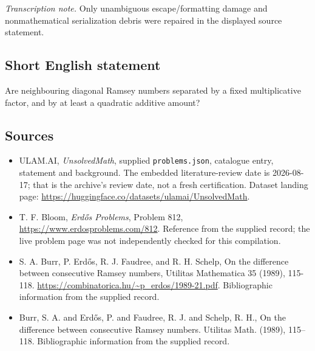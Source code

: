\documentclass[11pt,a4paper]{article}
\begin{document}
{\small\emph{Transcription note.} Only unambiguous escape/formatting damage and nonmathematical serialization debris were repaired in the displayed source statement.}

\subsection{Short English statement}

Are neighbouring diagonal Ramsey numbers separated by a fixed multiplicative factor, and by at least a quadratic additive amount?

\subsection{Sources}

{\small

\begin{itemize}

\item[\hypertarget{source:statement:1}{S1}] ULAM.AI, \emph{UnsolvedMath}, supplied \texttt{problems.json}, catalogue entry, statement and background. The embedded literature-review date is 2026-08-17; that is the archive’s review date, not a fresh certification. Dataset landing page: \url{https://huggingface.co/datasets/ulamai/UnsolvedMath}.

\item[\hypertarget{source:statement:2}{S2}] T. F. Bloom, \emph{Erdős Problems}, Problem 812, \url{https://www.erdosproblems.com/812}. Reference from the supplied record; the live problem page was not independently checked for this compilation.

\item[\hypertarget{source:statement:3}{S3}] S. A. Burr, P. Erdős, R. J. Faudree, and R. H. Schelp, On the difference between consecutive Ramsey numbers, Utilitas Mathematica 35 (1989), 115-118. \url{https://combinatorica.hu/~p_erdos/1989-21.pdf}. Bibliographic information from the supplied record.

\item[\hypertarget{source:statement:4}{S4}] Burr, S. A. and Erd\H{o}s, P. and Faudree, R. J. and Schelp, R. H., On the difference between consecutive {R}amsey numbers. Utilitas Math. (1989), 115--118. Bibliographic information from the supplied record.

\end{itemize}

}

\label{end:statement}
\end{document}
